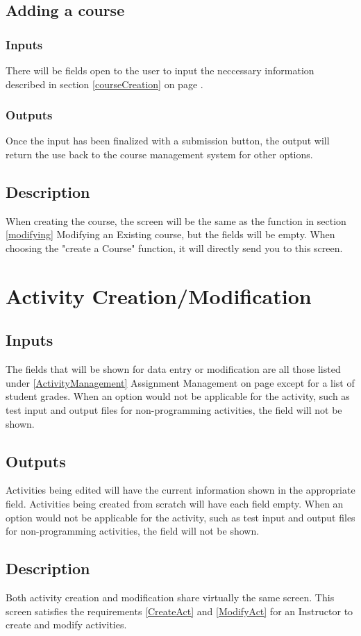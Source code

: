 \documentclass{article}
\begin{document}
\subsection{Adding a course}
\subsubsection{Inputs}
There will be fields open to the user to input the neccessary information described
in section \ref{courseCreation} on page \pageref{courseCreation}.
\subsubsection{Outputs}
Once the input has been finalized with a submission button, the output will return the use back to the course management system for other options.
\subsection{Description}
When creating the course, the screen will be the same as the function in section \ref{modifying} Modifying an Existing course, but the fields will be empty. When choosing the "create a Course" function, it will directly send you to this screen.


\section{Activity Creation/Modification}
\subsection{Inputs}
The fields that will be shown for data entry or modification are all those listed
under \ref{ActivityManagement} Assignment Management on page \pageref{ActivityManagement} except for a list of student grades.
When an option would not be applicable for the activity, such as test input and output files
for non-programming activities, the field will not be shown.
\subsection{Outputs}
Activities being edited will have the current information shown in the appropriate field.
Activities being created from scratch will have each field empty.
When an option would not be applicable for the activity, such as test input and output files
for non-programming activities, the field will not be shown.
\subsection{Description}
Both activity creation and modification share virtually the same screen.
This screen satisfies the requirements \ref{CreateAct} and \ref{ModifyAct} for an Instructor to create and modify activities.
\end{document}
